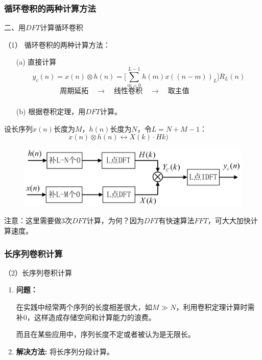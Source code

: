 \documentclass[notheorems,compress,mathserif,table]{beamer}
\begin{document}
\begin{frame}[shrink]\frametitle{循环卷积的两种计算方法}%

二、用$DFT$计算循环卷积

（1）   循环卷积的两种计算方法：
\begin{enumerate}
  \item [(a)] 直接计算
        $$y_c(n) = x(n) \otimes h(n) = \bigg[ \sum_{m=0}^{L-1} h(m) x((n-m))_L \bigg] R_L(n)$$
        $$\mbox{周期延拓}\quad \longrightarrow  \quad \mbox{线性卷积}\quad \longrightarrow \quad\mbox{取主值} \quad\quad\quad\quad$$
\end{enumerate}        
\end{frame}        
   
\begin{frame}[shrink]\frametitle{}%
\begin{enumerate}
	\item [(b)]   根据卷积定理，用$DFT$计算。\par
\end{enumerate}
  设长序列$x(n)$长度为$M$，$h(n)$长度为$N$，令$L=N+M-1$：
   $$x (n)\otimes h(n) \longleftrightarrow X(k)\cdot Hk)\quad\quad\quad\quad $$
   \vspace{-0.3cm}
  \begin{figure}
  	\centering
  	\label{fig:jisuanxunhuanjuanji}
  	\includegraphics[width=0.99\linewidth]{jisuanxunhuanjuanji.jpg}
  \end{figure}  
  注意：这里需要做3次$DFT$计算，为何？因为$DFT$有快速算法$FFT$，可大大加快计算速度。
\end{frame}
%
\begin{frame}[shrink]\frametitle{长序列卷积计算}%
（2）长序列卷积计算

\begin{enumerate}
  \item \textbf{问题：}\par
         在实践中经常两个序列的长度相差很大，如$M\gg N$，利用卷积定理计算时需补0，这样造成存储空间和计算能力的浪费。\par
         而且在某些应用中，序列长度不定或者被认为是无限长。
  \item \textbf{解决方法:} 将长序列分段计算。  \par
\end{enumerate}
\end{frame}
\end{document}
